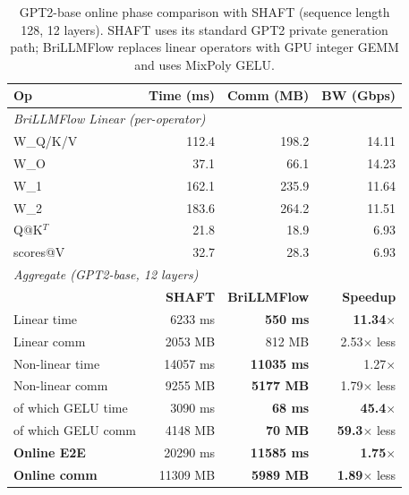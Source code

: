 \begin{table}[t]
\centering
\caption{GPT2-base online phase comparison with SHAFT (sequence length 128, 12 layers). SHAFT uses its standard GPT2 private generation path; BriLLMFlow replaces linear operators with GPU integer GEMM and uses MixPoly GELU.}
\label{tab:gpt2_shaft_comparison}
\setlength{\tabcolsep}{4pt}
\footnotesize
\begin{tabular}{lrrr}
\toprule
\textbf{Op} & \textbf{Time (ms)} & \textbf{Comm (MB)} & \textbf{BW (Gbps)} \\
\midrule
\multicolumn{4}{l}{\textit{BriLLMFlow Linear (per-operator)}} \\
W\_Q/K/V    & 112.4 & 198.2 & 14.11 \\
W\_O        & 37.1 & 66.1 & 14.23 \\
W\_1        & 162.1 & 235.9 & 11.64 \\
W\_2        & 183.6 & 264.2 & 11.51 \\
Q@K$^T$     & 21.8 & 18.9 & 6.93 \\
scores@V    & 32.7 & 28.3 & 6.93 \\
\midrule
\multicolumn{4}{l}{\textit{Aggregate (GPT2-base, 12 layers)}} \\
                       & \textbf{SHAFT} & \textbf{BriLLMFlow} & \textbf{Speedup} \\
Linear time            & 6233 ms & \textbf{550 ms} & \textbf{11.34}$\times$ \\
Linear comm            & 2053 MB & 812 MB & 2.53$\times$ less \\
Non-linear time        & 14057 ms & \textbf{11035 ms} & 1.27$\times$ \\
Non-linear comm        & 9255 MB & \textbf{5177 MB} & 1.79$\times$ less \\
\quad of which GELU time & 3090 ms & \textbf{68 ms} & \textbf{45.4}$\times$ \\
\quad of which GELU comm & 4148 MB & \textbf{70 MB} & \textbf{59.3}$\times$ less \\
\midrule
\textbf{Online E2E}    & 20290 ms & \textbf{11585 ms} & \textbf{1.75}$\times$ \\
\textbf{Online comm}   & 11309 MB & \textbf{5989 MB} & \textbf{1.89}$\times$ less \\
\bottomrule
\end{tabular}
\end{table}
